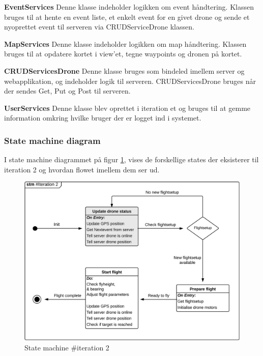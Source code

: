 \textbf{EventServices}
Denne klasse indeholder logikken om event håndtering. Klassen bruges til at hente en event liste, et enkelt event for en givet drone og sende et nyoprettet event til serveren via CRUDServiceDrone klassen.

\textbf{MapServices}
Denne klasse indeholder logikken om map håndtering. Klassen bruges til at opdatere kortet i view'et, tegne waypoints og dronen på kortet.


\newpage

\textbf{CRUDServicesDrone}
Denne klasse bruges som bindeled imellem server og webapplikation, og indeholder logik til serveren. CRUDServicesDrone bruges når der sendes Get, Put og Post til serveren.

\textbf{UserServices}
Denne klasse blev oprettet i iteration et og bruges til at gemme information omkring hvilke bruger der er logget ind i systemet.

\vspace{1cm}

\subsubsection*{State machine diagram}
\vspace{-0.1cm}
I state machine diagrammet på figur \ref{fig:Statemachine_iteration2}, vises de forskellige states der eksisterer til iteration 2 og hvordan flowet imellem dem ser ud. 
\begin{figure}[H]
	\centering
	\includegraphics[width=1\textwidth]{Billeder/statemachine/State_iteration2.png}
	\vspace{-0.5cm}
	\caption{State machine \#iteration 2}
	\label{fig:Statemachine_iteration2}
\end{figure}